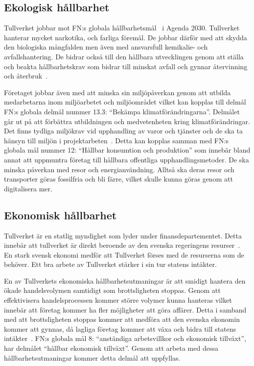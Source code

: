 \subsection{Ekologisk hållbarhet} \label{ekologisk}

Tullverket jobbar mot FN:s globala hållbarhetsmål~\cite{fnmal} i Agenda 2030.
Tullverket hanterar mycket narkotika, och farliga föremål. De jobbar därför med
att skydda den biologiska mångfalden men även med ansvarsfull kemikalie- och
avfallshantering. De bidrar också till den hållbara utvecklingen genom att
ställa och beakta hållbarhetskrav som bidrar till minskat avfall och gynnar
återvinning och återbruk~\cite{policy2021}.

Företaget jobbar även med att minska sin miljöpåverkan genom att utbilda
medarbetarna inom miljöarbetet och miljöområdet vilket kan kopplas till delmål
FN:s globala delmål nummer 13.3: ``Bekämpa klimatförändringarna''. Delmålet
går ut på att förbättra utbildningen och medvetenheten kring
klimatförändringar. Det finns tydliga miljökrav vid upphandling av varor och
tjänster och de ska ta hänsyn till miljön i projektarbeten~\cite{miljo}. Detta
kan kopplas samman med FN:s globala mål nummer 12: ``Hållbar konsumtion och
produktion'' som innebär bland annat att uppmuntra företag till hållbara
offentliga upphandlingsmetoder.  De ska minska påverkan med resor och
energianvändning. Alltså ska deras resor och transporter göras fossilfria och
bli färre, vilket skulle kunna göras genom att digitalisera mer. 

\subsection{Ekonomisk hållbarhet} \label{ekonomisk}

Tullverket är en statlig myndighet som lyder under finansdepartementet. Detta
innebär att tullverket är direkt beroende av den svenska regeringens
resurser~\cite{styrning}. En stark svensk ekonomi medför att Tullverket förses
med de resurserna som de behöver. Ett bra arbete av Tullverket stärker i sin
tur statens intäkter.

En av Tullverkets ekonomiska hållbarhetsutmaningar är att smidigt hantera den
ökade handelsvolymen samtidigt som brottsligheten stoppas. Genom att
effektivisera handelsprocessen kommer större volymer kunna hanteras vilket
innebär att företag kommer ha fler möjligheter att göra affärer. Detta i
samband med att brottsligheten stoppas kommer att medföra att den svenska
ekonomin kommer att gynnas, då lagliga företag kommer att växa och bidra till
statens intäkter~\cite{handeln}. FN:s globala mål 8: ``anständiga arbetsvillkor
och ekonomisk tillväxt'', har delmålet ``hållbar ekonomisk tillväxt''. Genom
att arbeta med dessa hållbarhetsutmaningar kommer detta delmål att uppfyllas. 
